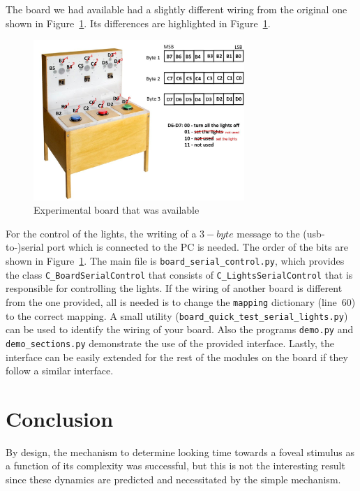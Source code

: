 \documentclass[conference]{IEEEtran}
\begin{document}
The board we had available had a slightly different wiring from the
original one shown in Figure~\ref{fig:experimental_board2}. Its
differences are highlighted in Figure~\ref{fig:experimental_board2}.
\begin{figure}[htb]
\begin{center}
\includegraphics[width=8cm]{lights2.jpg}
\end{center}
\caption{Experimental board that was available}
\label{fig:experimental_board2}
\end{figure}

For the control of the lights, the writing of a $3-byte$ message to
the (usb-to-)serial port which is connected to the PC is needed. The
order of the bits are shown in
Figure~\ref{fig:experimental_board2}. The main file is
\texttt{board\_serial\_control.py}, which provides the class
\texttt{C\_BoardSerialControl} that consists of
\texttt{C\_LightsSerialControl} that is responsible for controlling
the lights. If the wiring of another board is different from the one
provided, all is needed is to change the \texttt{mapping} dictionary
(line~60) to the correct mapping. A small utility
(\texttt{board\_quick\_test\_serial\_lights.py}) can be used to
identify the wiring of your board. Also the programs \texttt{demo.py}
and \texttt{demo\_sections.py} demonstrate the use of the provided
interface. Lastly, the interface can be easily extended for the rest
of the modules on the board if they follow a similar interface.

\section{Conclusion}
By design, the mechanism to determine looking time towards a foveal
stimulus as a function of its complexity was successful, but this is
not the interesting result since these dynamics are predicted and
necessitated by the simple mechanism.
\end{document}
